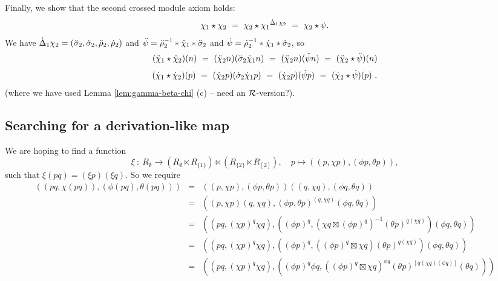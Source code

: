 \begin{pf}
Finally, we show that the second crossed module axiom holds:
$$ 
\chi_1 \star \chi_2 ~=~ \chi_2 \star {\chi_1}^{\dot{\Delta}_1 \chi_2} 
                    ~=~ \chi_2 \star \psi.
$$
We have $\dot{\Delta}_1 \chi_2 = (\ddot{\sigma}_2, \dot{\sigma}_2, \ddot{\rho}_2, \dot{\rho}_2)$ and  
$\ddot{\psi} = \ddot{\rho}_2^{-1} * \ddot{\chi}_1 * \ddot{\sigma}_2$ and 
$\dot{\psi} = \dot{\rho}_2^{-1} * \dot{\chi}_1 * \dot{\sigma}_2$,
so
$$
(\ddot{\chi}_1 \star \ddot{\chi}_2)(n) 
  ~=~ (\ddot{\chi}_2 n)(\ddot{\sigma}_2 \ddot{\chi}_1 n) \\
  ~=~ (\ddot{\chi}_2 n) (\ddot{\psi} n) \\
  ~=~ (\ddot{\chi}_2 \star \ddot{\psi})(n) \\
$$
$$
(\dot{\chi}_1 \star \dot{\chi}_2)(p) 
  ~=~ (\dot{\chi}_2 p)(\dot{\sigma}_2 \dot{\chi}_1 p) \\
  ~=~ (\dot{\chi}_2 p) (\dot{\psi} p) \\
  ~=~ (\dot{\chi}_2 \star \dot{\psi})(p)~.
$$
(where we have used Lemma \ref{lem:gamma-beta-chi} (c)  
 -- need an $\mathcal{R}$-version?).
\end{pf}


\subsection{Searching for a derivation-like map}
\label{subs:search}

We are hoping to find a function
$$
\xi ~:~ R_{\emptyset} \to (R_{\emptyset} \ltimes R_{\{1\}})
                 \ltimes (R_{\{2\}} \ltimes R_{[2]}),
\quad
p \mapsto ((p, \chi p), (\phi p, \theta p)),
$$
such that $\xi(pq) = (\xi p)(\xi q)$.
So we require
\begin{eqnarray*}
((pq, \chi(pq)), (\phi(pq), \theta(pq)))
  & = & ((p, \chi p),(\phi p, \theta p))((q, \chi q),(\phi q, \theta q)) \\
  & = & ((p, \chi p)(q, \chi q),
         (\phi p, \theta p)^{(q, \chi q)}(\phi q,\theta q)) \\
  & = & ((pq, (\chi p)^q \chi q),
         ((\phi p)^q, (\chi q \boxtimes (\phi p)^q)^{-1} 
                      (\theta p)^{q (\chi q)}) (\phi q, \theta q)) \\
  & = & ((pq, (\chi p)^q \chi q),
         ((\phi p)^q, ((\phi p)^q \boxtimes \chi q) 
                      (\theta p)^{q (\chi q)}) (\phi q, \theta q)) \\
  & = & ((pq, (\chi p)^q \chi q),
         ((\phi p)^q \phi q, ((\phi p)^q \boxtimes \chi q)^{\phi q} 
                      (\theta p)^{[q (\chi q)(\phi q)]} (\theta q))) \\
\end{eqnarray*}


